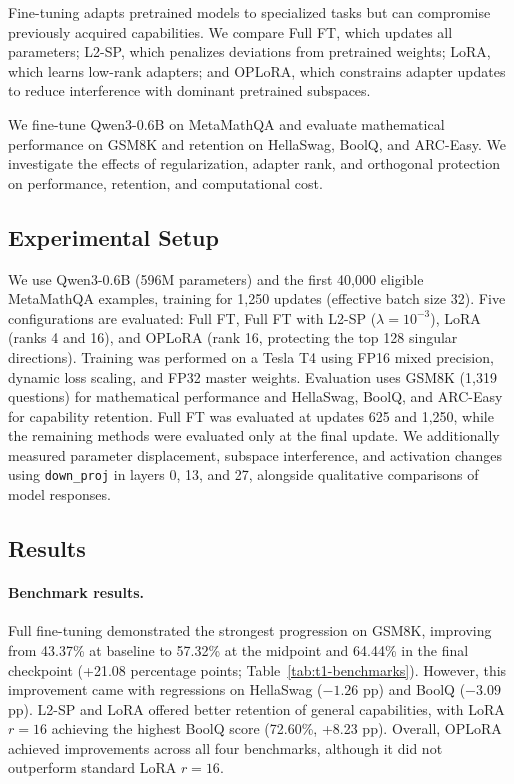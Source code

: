 \documentclass{article}
\begin{document}
Fine-tuning adapts pretrained models to specialized tasks but can compromise previously acquired capabilities. We compare Full FT, which updates all parameters; L2-SP, which penalizes deviations from pretrained weights; LoRA, which learns low-rank adapters; and OPLoRA, which constrains adapter updates to reduce interference with dominant pretrained subspaces.

We fine-tune Qwen3-0.6B on MetaMathQA and evaluate mathematical performance on GSM8K and retention on HellaSwag, BoolQ, and ARC-Easy. We investigate the effects of regularization, adapter rank, and orthogonal protection on performance, retention, and computational cost.

\subsection{Experimental Setup}
\label{sec:finetuning-setup}

We use Qwen3-0.6B (596M parameters) and the first 40,000 eligible MetaMathQA examples, training for 1,250 updates (effective batch size 32). Five configurations are evaluated: Full FT, Full FT with L2-SP ($\lambda=10^{-3}$), LoRA (ranks 4 and 16), and OPLoRA (rank 16, protecting the top 128 singular directions). Training was performed on a Tesla T4 using FP16 mixed precision, dynamic loss scaling, and FP32 master weights. Evaluation uses GSM8K (1,319 questions) for mathematical performance and HellaSwag, BoolQ, and ARC-Easy for capability retention. Full FT was evaluated at updates 625 and 1,250, while the remaining methods were evaluated only at the final update. We additionally measured parameter displacement, subspace interference, and activation changes using \texttt{down\_proj} in layers 0, 13, and 27, alongside qualitative comparisons of model responses.

\subsection{Results}
\label{sec:finetuning-results}

\paragraph{Benchmark results.}
Full fine-tuning demonstrated the strongest progression on GSM8K, improving from 43.37\% at baseline to 57.32\% at the midpoint and 64.44\% in the final checkpoint (+21.08 percentage points; Table~\ref{tab:t1-benchmarks}). However, this improvement came with regressions on HellaSwag ($-1.26$ pp) and BoolQ ($-3.09$ pp). L2-SP and LoRA offered better retention of general capabilities, with LoRA $r{=}16$ achieving the highest BoolQ score (72.60\%, +8.23 pp). Overall, OPLoRA achieved improvements across all four benchmarks, although it did not outperform standard LoRA $r{=}16$.
\end{document}
